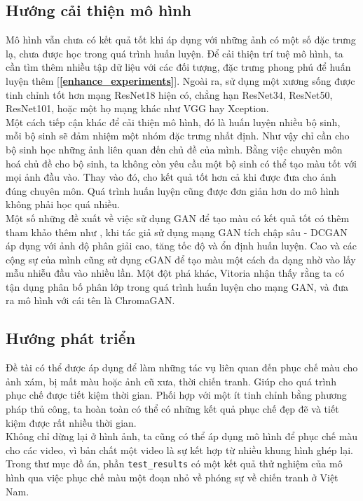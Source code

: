 \documentclass[a4paper, 12pt]{article}
\begin{document}
\subsection{Hướng cải thiện mô hình}
Mô hình vẫn chưa có kết quả tốt khi áp dụng với những ảnh có một số đặc trưng lạ, chưa được học trong quá trình huấn luyện. Để cải thiện trí tuệ mô hình, ta cần tìm thêm nhiều tập dữ liệu với các đối tượng, đặc trưng phong phú để huấn luyện thêm [\textbf{\ref{enhance_experiments}}]. Ngoài ra, sử dụng một xương sống được tinh chỉnh tốt hơn mạng ResNet18 hiện có, chẳng hạn ResNet34, ResNet50, ResNet101, hoặc một họ mạng khác như VGG hay Xception.\vspace{5pt}\\
Một cách tiếp cận khác để cải thiện mô hình, đó là huấn luyện nhiều bộ sinh, mỗi bộ sinh sẽ đảm nhiệm một nhóm đặc trưng nhất định. Như vậy chỉ cần cho bộ sinh học những ảnh liên quan đến chủ đề của mình. Bằng việc chuyên môn hoá chủ đề cho bộ sinh, ta không còn yêu cầu một bộ sinh có thể tạo màu tốt với mọi ảnh đầu vào. Thay vào đó, cho kết quả tốt hơn cả khi được đưa cho ảnh đúng chuyên môn. Quá trình huấn luyện cũng được đơn giản hơn do mô hình không phải học quá nhiều.\vspace{5pt}\\
Một số những đề xuất về việc sử dụng GAN để tạo màu có kết quả tốt có thêm tham khảo thêm như \cite{Nazeri_2018}, khi tác giả sử dụng mạng GAN tích chập sâu - DCGAN áp dụng với ảnh độ phân giải cao, tăng tốc độ và ổn định huấn luyện. Cao và các cộng sự của mình \cite{cao2017unsupervised} cũng sử dụng cGAN để tạo màu một cách đa dạng nhờ vào lấy mẫu nhiễu đầu vào nhiều lần. Một đột phá khác, Vitoria \cite{vitoria2020chromagan} nhận thấy rằng ta có tận dụng phân bố phân lớp trong quá trình huấn luyện cho mạng GAN, và đưa ra mô hình với cái tên là ChromaGAN.

\subsection{Hướng phát triển}
Đề tài có thể được áp dụng để làm những tác vụ liên quan đến phục chế màu cho ảnh xám, bị mất màu hoặc ảnh cũ xưa, thời chiến tranh. Giúp cho quá trình phục chế được tiết kiệm thời gian. Phối hợp với một ít tinh chỉnh bằng phương pháp thủ công, ta hoàn toàn có thể có những kết quả phục chế đẹp đẽ và tiết kiệm được rất nhiều thời gian.\vspace{5pt}\\
Không chỉ dừng lại ở hình ảnh, ta cũng có thể áp dụng mô hình để phục chế màu cho các video, vì bản chất một video là sự kết hợp từ nhiều khung hình ghép lại. Trong thư mục đồ án, phần \texttt{test\_results} có một kết quả thử nghiệm của mô hình qua việc phục chế màu một đoạn nhỏ về phóng sự về chiến tranh ở Việt Nam.
\end{document}
